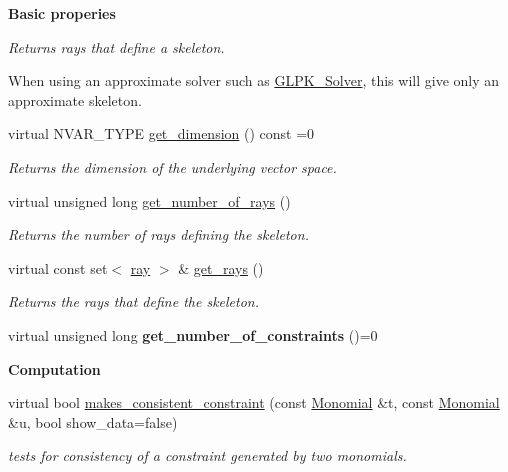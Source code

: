 \begin{Indent}\textbf{ Basic properies}\par
{\em Returns rays that define a skeleton.

When using an approximate solver such as \hyperlink{class_g_l_p_k___solver}{G\+L\+P\+K\+\_\+\+Solver}, this will give only an approximate skeleton. }\begin{DoxyCompactItemize}
\item 
\mbox{\label{class_l_p___solver_ae85c7e9a24774fd3c08a7dd9a7b8a27c}} 
virtual N\+V\+A\+R\+\_\+\+T\+Y\+PE \hyperlink{class_l_p___solver_ae85c7e9a24774fd3c08a7dd9a7b8a27c}{get\+\_\+dimension} () const =0
\begin{DoxyCompactList}\small\item\em Returns the dimension of the underlying vector space. \end{DoxyCompactList}\item 
\mbox{\label{class_l_p___solver_a4262d944695d0cfcddf9e24908f72e8f}} 
virtual unsigned long \hyperlink{class_l_p___solver_a4262d944695d0cfcddf9e24908f72e8f}{get\+\_\+number\+\_\+of\+\_\+rays} ()
\begin{DoxyCompactList}\small\item\em Returns the number of rays defining the skeleton. \end{DoxyCompactList}\item 
\mbox{\label{class_l_p___solver_a06363bbbc8dfdb4c161a001d24f94afd}} 
virtual const set$<$ \hyperlink{classray}{ray} $>$ \& \hyperlink{class_l_p___solver_a06363bbbc8dfdb4c161a001d24f94afd}{get\+\_\+rays} ()
\begin{DoxyCompactList}\small\item\em Returns the rays that define the skeleton. \end{DoxyCompactList}\item 
\mbox{\label{class_l_p___solver_a0b587fd39cbefe969e4b3dbf34387b08}} 
virtual unsigned long {\bfseries get\+\_\+number\+\_\+of\+\_\+constraints} ()=0
\end{DoxyCompactItemize}
\end{Indent}
\begin{Indent}\textbf{ Computation}\par
\begin{DoxyCompactItemize}
\item 
\mbox{\label{class_l_p___solver_a2e909dd41a7f116c62868e3e6c278a2e}} 
virtual bool \hyperlink{class_l_p___solver_a2e909dd41a7f116c62868e3e6c278a2e}{makes\+\_\+consistent\+\_\+constraint} (const \hyperlink{class_monomial}{Monomial} \&t, const \hyperlink{class_monomial}{Monomial} \&u, bool show\+\_\+data=false)
\begin{DoxyCompactList}\small\item\em tests for consistency of a constraint generated by two monomials. \end{DoxyCompactList}\end{DoxyCompactItemize}
\end{Indent}
